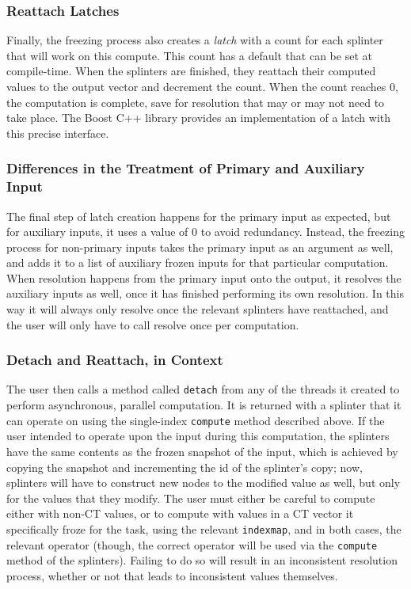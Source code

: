 \documentclass[pageno]{jpaper}
\begin{document}
\subsubsection{Reattach Latches}
Finally, the freezing process also creates a \textit{latch} with a count for each
splinter that will work on this compute. This count has a default that can be
set at compile-time. When the splinters are finished, they reattach their
computed values to the output vector and decrement the count. When the count
reaches 0, the computation is complete, save for resolution that may or may not
need to take place. The Boost C++ library provides an implementation of a latch with 
this precise interface.

\subsubsection{Differences in the Treatment of Primary and Auxiliary Input}
The final step of latch creation happens for the primary input as expected, but for 
auxiliary inputs, it uses a value of 0 to avoid redundancy. 
Instead, the freezing process for non-primary inputs takes the primary input as an 
argument as well, and adds it to a list of auxiliary frozen inputs for that particular
computation. When resolution happens from the primary input onto the output, it resolves 
the auxiliary inputs as well, once it has finished performing its own resolution. In 
this way it will always only resolve once the relevant splinters have reattached, and 
the user will only have to call resolve once per computation.

\subsubsection{Detach and Reattach, in Context}
The user then calls a method called \texttt{detach} from any of the threads it created 
to perform asynchronous, parallel computation. It is returned with a splinter that it 
can operate on using the single-index \texttt{compute} method described above. If the 
user intended to operate upon the input during this computation, the  
splinters have the same contents as the frozen snapshot of the input, which is achieved 
by copying the snapshot and incrementing the id of the splinter's copy; now, splinters 
will have to construct new nodes to the modified value as well, but only for the values 
that they modify. The user 
must either be careful to compute either with non-CT values, or to compute with values 
in a CT vector it specifically froze for the task, using the relevant \texttt{indexmap}, and in 
both cases, the relevant operator (though, the correct operator will be used via the
\texttt{compute} method of the splinters). Failing to do so will result in an inconsistent 
resolution process, whether or not that leads to inconsistent values themselves.
\end{document}
